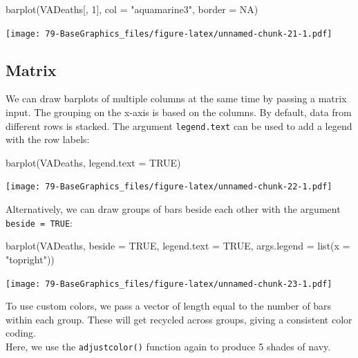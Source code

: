 \documentclass[
]{book}
\newenvironment{Shaded}{\begin{snugshade}}{\end{snugshade}}
\newcommand{\AttributeTok}[1]{\textcolor[rgb]{0.77,0.63,0.00}{#1}}
\newcommand{\ConstantTok}[1]{\textcolor[rgb]{0.00,0.00,0.00}{#1}}
\newcommand{\DecValTok}[1]{\textcolor[rgb]{0.00,0.00,0.81}{#1}}
\newcommand{\FunctionTok}[1]{\textcolor[rgb]{0.00,0.00,0.00}{#1}}
\newcommand{\NormalTok}[1]{#1}
\newcommand{\StringTok}[1]{\textcolor[rgb]{0.31,0.60,0.02}{#1}}
\begin{document}
\begin{Shaded}
\begin{Highlighting}[]
\FunctionTok{barplot}\NormalTok{(VADeaths[, }\DecValTok{1}\NormalTok{],}
        \AttributeTok{col =} \StringTok{"aquamarine3"}\NormalTok{, }\AttributeTok{border =} \ConstantTok{NA}\NormalTok{)}
\end{Highlighting}
\end{Shaded}

\texttt{[image: 79-BaseGraphics\_files/figure-latex/unnamed-chunk-21-1.pdf]}

\hypertarget{matrix}{%
\subsection{Matrix}\label{matrix}}

We can draw barplots of multiple columns at the same time by passing a matrix input. The grouping on the x-axis is based on the columns. By default, data from different rows is stacked. The argument \texttt{legend.text} can be used to add a legend with the row labels:

\begin{Shaded}
\begin{Highlighting}[]
\FunctionTok{barplot}\NormalTok{(VADeaths, }\AttributeTok{legend.text =} \ConstantTok{TRUE}\NormalTok{)}
\end{Highlighting}
\end{Shaded}

\texttt{[image: 79-BaseGraphics\_files/figure-latex/unnamed-chunk-22-1.pdf]}

Alternatively, we can draw groups of bars beside each other with the argument \texttt{beside\ =\ TRUE}:

\begin{Shaded}
\begin{Highlighting}[]
\FunctionTok{barplot}\NormalTok{(VADeaths, }\AttributeTok{beside =} \ConstantTok{TRUE}\NormalTok{,}
        \AttributeTok{legend.text =} \ConstantTok{TRUE}\NormalTok{, }\AttributeTok{args.legend =} \FunctionTok{list}\NormalTok{(}\AttributeTok{x =} \StringTok{"topright"}\NormalTok{))}
\end{Highlighting}
\end{Shaded}

\texttt{[image: 79-BaseGraphics\_files/figure-latex/unnamed-chunk-23-1.pdf]}

To use custom colors, we pass a vector of length equal to the number of bars within each group. These will get recycled across groups, giving a consistent color coding.\\
Here, we use the \texttt{adjustcolor()} function again to produce 5 shades of navy.
\end{document}
